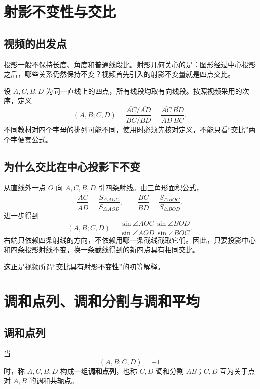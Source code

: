 \documentclass[UTF8,11pt]{ctexart}
\newcommand{\dirseg}[2]{\overline{#1#2}}
\begin{document}
\section{射影不变性与交比}

\subsection{视频的出发点}

投影一般不保持长度、角度和普通线段比。射影几何关心的是：图形经过中心投影之后，哪些关系仍然保持不变？视频首先引入的射影不变量就是四点交比。

设 $A,C,B,D$ 为同一直线上的四点，所有线段均取有向线段。按照视频采用的次序，定义
\begin{equation}
\label{eq:cross-ratio}
(A,B;C,D)
=\frac{\dirseg AC/\dirseg AD}{\dirseg BC/\dirseg BD}
=\frac{\dirseg AC\,\dirseg BD}{\dirseg AD\,\dirseg BC}.
\end{equation}
不同教材对四个字母的排列可能不同，使用时必须先核对定义，不能只看“交比”两个字便套公式。

\subsection{为什么交比在中心投影下不变}

从直线外一点 $O$ 向 $A,C,B,D$ 引四条射线。由三角形面积公式，
\[
\frac{\dirseg AC}{\dirseg AD}
=\frac{S_{\triangle AOC}}{S_{\triangle AOD}},
\qquad
\frac{\dirseg BC}{\dirseg BD}
=\frac{S_{\triangle BOC}}{S_{\triangle BOD}}.
\]
进一步得到
\begin{equation}
\label{eq:sine-cross-ratio}
(A,B;C,D)
=\frac{\sin\angle AOC}{\sin\angle AOD}
 \frac{\sin\angle BOD}{\sin\angle BOC}.
\end{equation}
右端只依赖四条射线的方向，不依赖用哪一条截线截取它们。因此，只要投影中心和四条投影射线不变，换一条截线得到的新四点具有相同交比。

这正是视频所谓“交比具有射影不变性”的初等解释。

\section{调和点列、调和分割与调和平均}

\subsection{调和点列}

当
\begin{equation}
\label{eq:harmonic}
(A,B;C,D)=-1
\end{equation}
时，称 $A,C,B,D$ 构成一组\textbf{调和点列}，也称 $C,D$ 调和分割 $AB$；$C,D$ 互为关于点对 $A,B$ 的调和共轭点。
\end{document}
